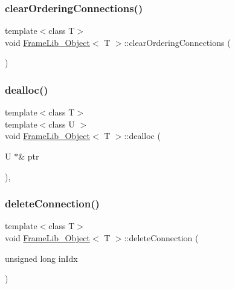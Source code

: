 \subsubsection{\texorpdfstring{clear\+Ordering\+Connections()}{clearOrderingConnections()}}
{\footnotesize\ttfamily template$<$class T$>$ \\
void \hyperlink{class_frame_lib___object}{Frame\+Lib\+\_\+\+Object}$<$ T $>$\+::clear\+Ordering\+Connections (\begin{DoxyParamCaption}{ }\end{DoxyParamCaption})\hspace{0.3cm}{\ttfamily [inline]}}

\mbox{\label{class_frame_lib___object_ab42be79621db7363ca4a34f63704d04f}} 
\subsubsection{\texorpdfstring{dealloc()}{dealloc()}}
{\footnotesize\ttfamily template$<$class T$>$ \\
template$<$class U $>$ \\
void \hyperlink{class_frame_lib___object}{Frame\+Lib\+\_\+\+Object}$<$ T $>$\+::dealloc (\begin{DoxyParamCaption}\item[{U $\ast$\&}]{ptr }\end{DoxyParamCaption})\hspace{0.3cm}{\ttfamily [inline]}, {\ttfamily [protected]}}

\mbox{\label{class_frame_lib___object_aa7dbc1735ebd68008abd939d50edce49}} 
\subsubsection{\texorpdfstring{delete\+Connection()}{deleteConnection()}}
{\footnotesize\ttfamily template$<$class T$>$ \\
void \hyperlink{class_frame_lib___object}{Frame\+Lib\+\_\+\+Object}$<$ T $>$\+::delete\+Connection (\begin{DoxyParamCaption}\item[{unsigned long}]{in\+Idx }\end{DoxyParamCaption})\hspace{0.3cm}{\ttfamily [inline]}}

